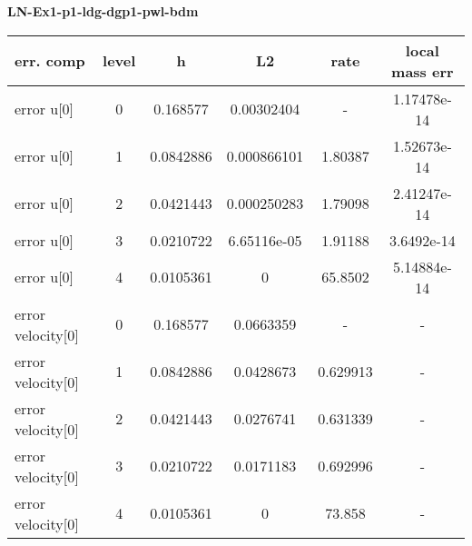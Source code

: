 \documentclass{amsart}
\begin{document}
\begin{center}   
{\bf LN-Ex1-p1-ldg-dgp1-pwl-bdm }\end{center}  
\tableofcontents

\begin{table}[h!]
\begin{tabular}{|l|c|c|c|c|c|}
\hline
err. comp & level & h  & L2 & rate  & local mass err \\ 
\hline
error u[0] & 0 & 0.168577  & 0.00302404 & -   &  1.17478e-14 \\ 
error u[0] & 1 & 0.0842886 & 0.000866101 & 1.80387   &  1.52673e-14 \\ 
error u[0] & 2 & 0.0421443 & 0.000250283 & 1.79098   &  2.41247e-14 \\ 
error u[0] & 3 & 0.0210722 & 6.65116e-05 & 1.91188   &  3.6492e-14 \\ 
error u[0] & 4 & 0.0105361 & 0 & 65.8502   &  5.14884e-14 \\ 
error velocity[0] & 0 & 0.168577  & 0.0663359 & -   & - \\ 
error velocity[0] & 1 & 0.0842886 & 0.0428673 & 0.629913   & - \\ 
error velocity[0] & 2 & 0.0421443 & 0.0276741 & 0.631339   & - \\ 
error velocity[0] & 3 & 0.0210722 & 0.0171183 & 0.692996   & - \\ 
error velocity[0] & 4 & 0.0105361 & 0 & 73.858   & - \\ 

\hline
\end{tabular}
\end{table}
\end{document}

